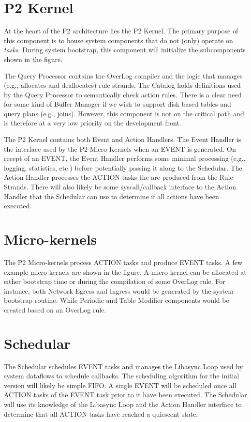 \documentclass[12pt]{article}
\begin{document}
\newpage

\section{P2 Kernel}
At the heart of the P2 architecture lies the P2 Kernel. The primary purpose of this
component is to house system components that do not (only) operate on \emph{tasks}. 
During system bootstrap, this component will initialize the subcomponents shown
in the figure. 

The Query Processor contains the OverLog compiler and the logic that
manages (e.g., allocates and deallocates) rule strands.  The Catalog holds definitions
used by the Query Processor to semantically check action rules. There is a clear need
for some kind of Buffer Manager if we wish to support disk based tables and query plans
(e.g., joins). However, this component is not on the critical path and is therefore at a 
very low priority on the development front. 

The P2 Kernel contains both Event and Action Handlers. The Event Handler is
the interface used by the P2 Micro-Kernels when an EVENT is generated. On recept
of an EVENT, the Event Handler performs some minimal processing (e.g., logging, 
statistics, etc.) before potentially passing it along to the Schedular. The Action Handler
processes the ACTION tasks the are produced from the Rule Strands. There will also
likely be some syscall/callback interface to the Action Handler that the Schedular can 
use to determine if all actions have been executed.

\section{Micro-kernels}

The P2 Micro-kernels process ACTION tasks and produce EVENT tasks. A few example micro-kernels are shown in the figure. A micro-kernel can be allocated at either 
bootstrap time or during the compilation of some OverLog rule. For instance, both 
Network Egress and Ingress would be generated by the system bootstrap routine. While
Periodic and Table Modifier components would be created based on an OverLog rule.


\section{Schedular}

The Schedular schedules EVENT tasks and manages the Libasync Loop used by
system dataflows to schedule callbacks. The scheduling algorithm for the initial version
will likely be simple FIFO. A single EVENT will be scheduled once all ACTION tasks
of the EVENT task prior to it have been executed. The Schedular will use its knowledge 
of the Libasync Loop and the Action Handler interface to determine that all ACTION 
tasks have reached a quiescent state.
\end{document}
